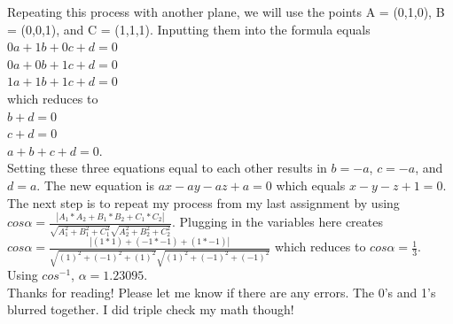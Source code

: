 \documentclass{article}
\begin{document}
Repeating this process with another plane, we will use the points A = (0,1,0), B = (0,0,1), and C = (1,1,1). Inputting them into the formula equals\\
$0a+1b+0c+d=0$\\
$0a+0b+1c+d=0$\\
$1a+1b+1c+d=0$\\
which reduces to\\
$b+d=0$\\
$c+d=0$\\
$a+b+c+d=0$.\\
Setting these three equations equal to each other results in $b=-a$, $c=-a$, and $d=a$. The new equation is $ax-ay-az+a=0$ which equals $x-y-z+1=0$.\\
The next step is to repeat my process from my last assignment by using $cos\alpha=\frac{|A_1*A_2+B_1*B_2+C_1*C_2|}{\sqrt{A_1^2+B_1^2+C_1^2}\sqrt{A_2^2+B_2^2+C_2^2}}$. Plugging in the variables here creates $cos\alpha=\frac{|(1*1)+(-1*-1)+(1*-1)|}{\sqrt{(1)^2+(-1)^2+(1)^2}\sqrt{(1)^2+(-1)^2+(-1)^2}}$ which reduces to $cos\alpha=\frac{1}{3}$. Using $cos^{-1}$, $\alpha=1.23095$.\\
Thanks for reading! Please let me know if there are any errors. The 0's and 1's blurred together. I did triple check my math though!
\end{document}
